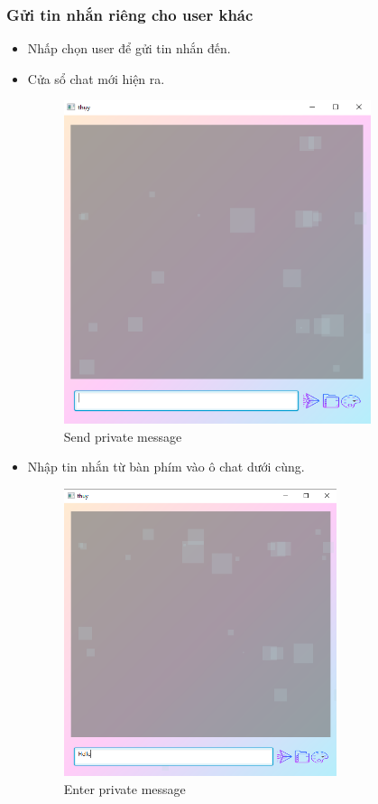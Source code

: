 \documentclass[a4paper]{article}
\begin{document}
	\subsubsection{Gửi tin nhắn riêng cho user khác}
	\begin{itemize}
		\item Nhấp chọn user để gửi tin nhắn đến.
		\item Cửa sổ chat mới hiện ra.     
		\begin{figure}[h!]
			\centering
			\includegraphics[width=9cm]{start-chat-private.PNG}
			\caption{Send private message}
			\label{fig:my_label}
		\end{figure}
		\item Nhập tin nhắn từ bàn phím vào ô chat dưới cùng.
		\begin{figure}[h!]
			\centering
			\includegraphics[width=8cm]{enter-message-private.PNG}
			\caption{Enter private message}

\end{figure}
\end{itemize}
\end{document}
